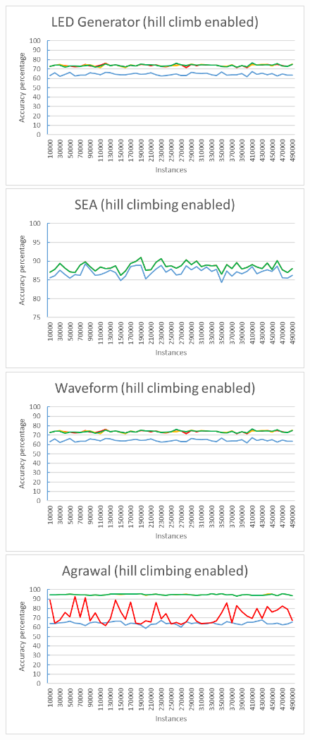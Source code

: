 \begin{figure}[h]
\begin{center}
\includegraphics[scale=0.25]{Graphs/LED/H_graph}
\includegraphics[scale=0.25]{Graphs/SEA/H_graph}
\includegraphics[scale=0.25]{Graphs/Waveform/H_graph}
\includegraphics[scale=0.25]{Graphs/Agrawal/H_graph}

\end{center}
\end{figure}
